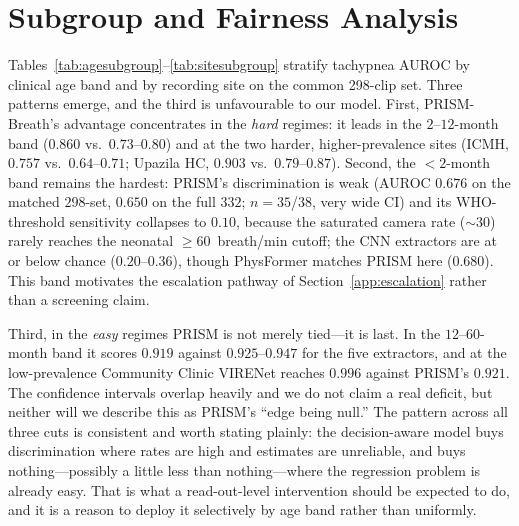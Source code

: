 \section{Subgroup and Fairness Analysis}
\label{app:subgroup}
Tables~\ref{tab:agesubgroup}--\ref{tab:sitesubgroup} stratify tachypnea AUROC by clinical age band and by
recording site on the common 298-clip set. Three patterns emerge, and the third is unfavourable to our
model. First, PRISM-Breath's advantage concentrates in the \emph{hard} regimes: it leads in the
$2$--$12$-month band ($0.860$ vs.\ $0.73$--$0.80$) and at the two harder, higher-prevalence sites (ICMH,
$0.757$ vs.\ $0.64$--$0.71$; Upazila HC, $0.903$ vs.\ $0.79$--$0.87$). Second, the $<2$-month band remains
the hardest: PRISM's discrimination is weak (AUROC $0.676$ on the matched $298$-set, $0.650$ on the full
$332$; $n{=}35$/$38$, very wide CI) and its WHO-threshold sensitivity collapses to $0.10$, because the
saturated camera rate ($\sim$$30$) rarely reaches the neonatal $\ge 60$~breath/min cutoff; the CNN
extractors are at or below chance ($0.20$--$0.36$), though PhysFormer matches PRISM here ($0.680$). This
band motivates the escalation pathway of Section~\ref{app:escalation} rather than a screening claim.

Third, in the \emph{easy} regimes PRISM is not merely tied---it is last. In the $12$--$60$-month band it
scores $0.919$ against $0.925$--$0.947$ for the five extractors, and at the low-prevalence Community
Clinic VIRENet reaches $0.996$ against PRISM's $0.921$. The confidence intervals overlap heavily and we
do not claim a real deficit, but neither will we describe this as PRISM's ``edge being null.'' The
pattern across all three cuts is consistent and worth stating plainly: the decision-aware model buys
discrimination where rates are high and estimates are unreliable, and buys nothing---possibly a little
less than nothing---where the regression problem is already easy. That is what a read-out-level
intervention should be expected to do, and it is a reason to deploy it selectively by age band rather
than uniformly.

